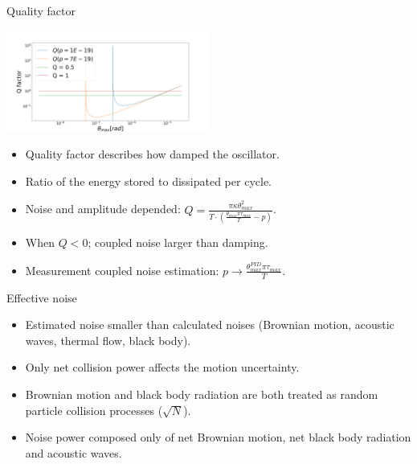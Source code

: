 \documentclass{beamer}
\begin{document}
\begin{frame}{Quality factor}
	\begin{center}		
		\includegraphics[width=0.5\textwidth,keepaspectratio]{Q factor.png}
	\end{center}
	\begin{itemize}	
		\item Quality factor describes how damped the oscillator.
		\item Ratio of the energy stored to dissipated per cycle.
		\item Noise and amplitude depended: $Q =  \frac{\pi\kappa\theta_{max}^2}{T\cdot(\frac{\theta_{max}\pi\tau_{max}}{T} -p)} $.
		\item When $Q<0$; coupled noise larger than damping.
		\item Measurement coupled noise estimation: $p \rightarrow \frac{ \theta_{max}^{PID}\pi\tau_{max}}{T}$. 				
	\end{itemize}
\end{frame}

\begin{frame}{Effective noise}
	
	\begin{itemize}	
		\item Estimated noise smaller than calculated noises (Brownian motion, acoustic waves, thermal flow, black body).
		\item Only net collision power affects the motion uncertainty.
		\item Brownian motion and black body radiation are both treated as random particle collision processes ($\sqrt{N}$).
		\item Noise power composed only of net Brownian motion, net black body radiation and acoustic waves.  	 
					
	\end{itemize}
\end{frame}
\end{document}
